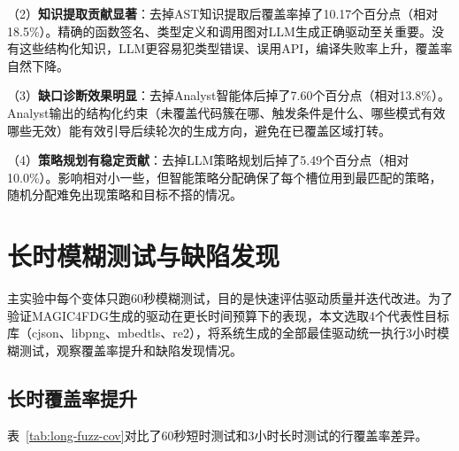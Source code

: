 （2）\textbf{知识提取贡献显著}：去掉AST知识提取后覆盖率掉了10.17个百分点（相对18.5\%）。精确的函数签名、类型定义和调用图对LLM生成正确驱动至关重要。没有这些结构化知识，LLM更容易犯类型错误、误用API，编译失败率上升，覆盖率自然下降。

（3）\textbf{缺口诊断效果明显}：去掉Analyst智能体后掉了7.60个百分点（相对13.8\%）。Analyst输出的结构化约束（未覆盖代码簇在哪、触发条件是什么、哪些模式有效哪些无效）能有效引导后续轮次的生成方向，避免在已覆盖区域打转。

（4）\textbf{策略规划有稳定贡献}：去掉LLM策略规划后掉了5.49个百分点（相对10.0\%）。影响相对小一些，但智能策略分配确保了每个槽位用到最匹配的策略，随机分配难免出现策略和目标不搭的情况。

\section{长时模糊测试与缺陷发现}

主实验中每个变体只跑60秒模糊测试，目的是快速评估驱动质量并迭代改进。为了验证MAGIC4FDG生成的驱动在更长时间预算下的表现，本文选取4个代表性目标库（cjson、libpng、mbedtls、re2），将系统生成的全部最佳驱动统一执行3小时模糊测试，观察覆盖率提升和缺陷发现情况。

\subsection{长时覆盖率提升}

表~\ref{tab:long-fuzz-cov}对比了60秒短时测试和3小时长时测试的行覆盖率差异。

\begin{table}[H]
    \centering
    \caption{长时模糊测试覆盖率提升}
    \label{tab:long-fuzz-cov}
\end{table}

